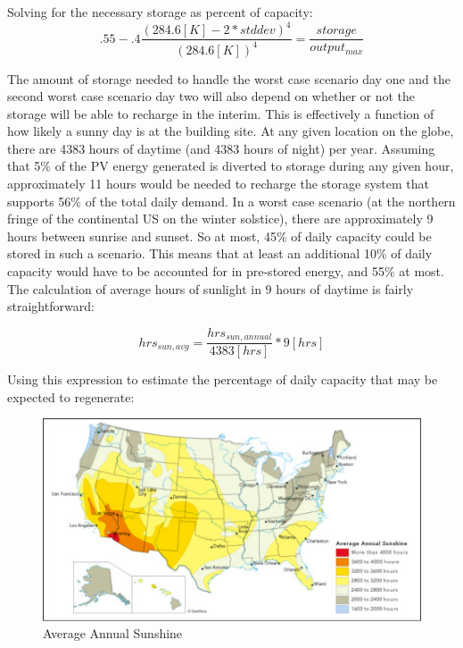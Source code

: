 Solving for the necessary storage as percent of capacity:
\begin{equation}
.55-.4\frac{(284.6[K]-2*stddev)^4}{(284.6[K])^4}=\frac{storage}{output_{max}}
\end{equation}

The amount of storage needed to handle the worst case scenario day one and the
second worst case scenario day two will also depend on whether or not the
storage will be able to recharge in the interim. This is effectively a function
of how likely a sunny day is at the building site. At any given location on the
globe, there are 4383 hours of daytime (and 4383 hours of night) per year.
Assuming that 5\% of the PV energy generated is diverted to storage during any
given hour, approximately 11 hours would be needed to recharge the storage
system that supports 56\% of the total daily demand. In a worst case scenario
(at the northern fringe of the continental US on the winter solstice), there
are approximately 9 hours between sunrise and sunset. So at most, 45\% of daily
capacity could be stored in such a scenario. This means that at least an
additional 10\% of daily capacity would have to be accounted for in pre-stored
energy, and 55\% at most. The calculation of average hours of sunlight in 9
hours of daytime is fairly straightforward:

\begin{equation}
hrs_{sun,avg}=\frac{hrs_{sun,annual}}{4383 [hrs]}*9 [hrs]
\end{equation}

Using this expression to estimate the percentage of daily capacity that may be
expected to regenerate:

\begin{figure}
\begin{center}
\includegraphics[scale=0.6]{pics/PatrickFigure4.png}
\caption{Average Annual Sunshine}
\label{p4}
\end{center}
\end{figure}

